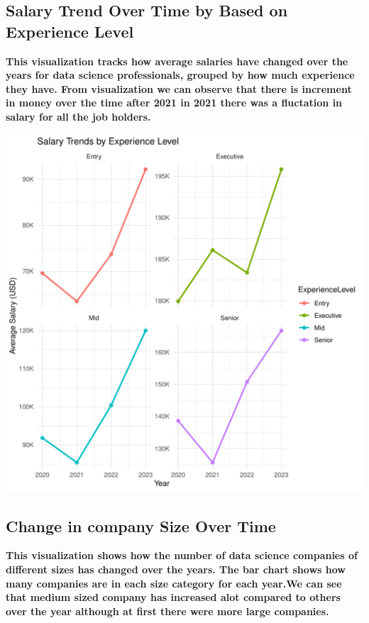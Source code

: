 \documentclass{article}\usepackage[]{graphicx}\usepackage[]{xcolor}
\makeatletter
\def\maxwidth{ %
  \ifdim\Gin@nat@width>\linewidth
    \linewidth
  \else
    \Gin@nat@width
  \fi
}
\newenvironment{knitrout}{}{} %
\makeatother
\begin{document}
\newpage
\subsection{Salary Trend Over Time by Based on Experience Level}
\textbf{This visualization tracks how average salaries have changed over the years for data science professionals, grouped by how much experience they have. From visualization we can observe that there is increment in money over the time after 2021 in 2021 there was a fluctation in salary for all the job holders.} 

\begin{knitrout}
\color{fgcolor}
\includegraphics[width=\maxwidth]{figure/unnamed-chunk-5-1} 
\end{knitrout}


\newpage
\subsection{Change in company Size Over Time}
\textbf{This visualization shows how the number of data science companies of different sizes has changed over the years. The bar chart shows how many companies are in each size category for each year.We can see that medium sized company has increased alot compared to others over the year although at first there were more large companies. }
\end{document}
